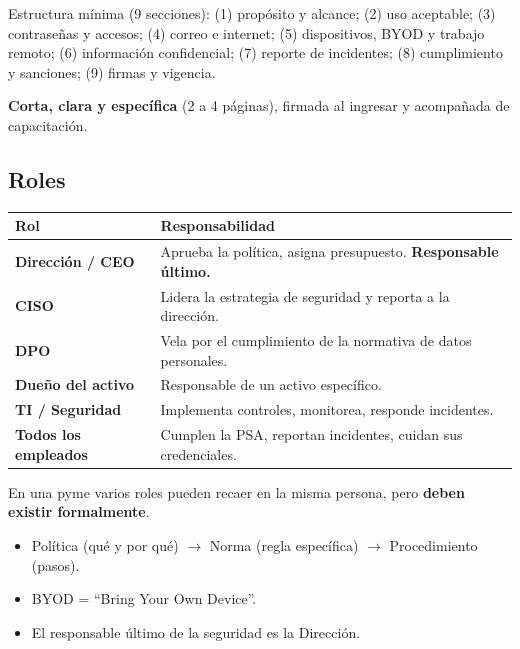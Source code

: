 \documentclass[12pt,a4paper]{article}
\begin{document}
Estructura m\'inima (9 secciones): (1) prop\'osito y alcance; (2) uso aceptable;
(3) contrase\~nas y accesos; (4) correo e internet; (5) dispositivos, BYOD y trabajo
remoto; (6) informaci\'on confidencial; (7) reporte de incidentes; (8) cumplimiento y
sanciones; (9) firmas y vigencia.

\begin{cajaNota}[title={Regla de oro de una PSA}]
\textbf{Corta, clara y espec\'ifica} (2 a 4 p\'aginas), firmada al ingresar y
acompa\~nada de capacitaci\'on.
\end{cajaNota}

\subsection{Roles}
\begin{tabularx}{\textwidth}{|>{\bfseries}p{3.8cm}|X|}
\hline
\rowcolor{grisClaro}
Rol & Responsabilidad \\
\hline
Direcci\'on / CEO & Aprueba la pol\'itica, asigna presupuesto. \textbf{Responsable \'ultimo.} \\
\hline
CISO & Lidera la estrategia de seguridad y reporta a la direcci\'on. \\
\hline
DPO & Vela por el cumplimiento de la normativa de datos personales. \\
\hline
Due\~no del activo & Responsable de un activo espec\'ifico. \\
\hline
TI / Seguridad & Implementa controles, monitorea, responde incidentes. \\
\hline
Todos los empleados & Cumplen la PSA, reportan incidentes, cuidan sus credenciales. \\
\hline
\end{tabularx}

En una pyme varios roles pueden recaer en la misma persona, pero \textbf{deben
existir formalmente}.

\begin{cajaResumen}
\begin{itemize}
  \item Pol\'itica (qu\'e y por qu\'e) $\rightarrow$ Norma (regla espec\'ifica) $\rightarrow$ Procedimiento (pasos).
  \item BYOD = ``Bring Your Own Device''.
  \item El responsable \'ultimo de la seguridad es la Direcci\'on.
\end{itemize}
\end{cajaResumen}

\end{document}
